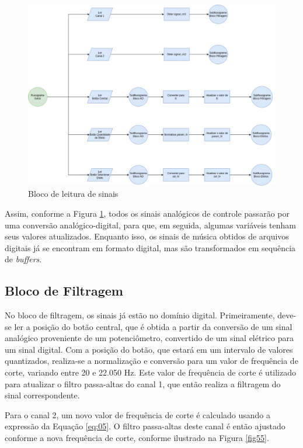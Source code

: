 \begin{figure}[h]
    \centering
    \includegraphics[width=\textwidth]{figuras/fig54.png}
    \caption{Bloco de leitura de sinais}
    \label{fig54}
\end{figure}

Assim, conforme a Figura \ref{fig54}, todos os sinais analógicos de controle passarão por uma conversão analógico-digital, para que, em seguida, algumas variáveis tenham seus valores atualizados. Enquanto isso, os sinais de música obtidos de arquivos digitais já se encontram em formato digital, mas são transformados em sequência de \textit{buffers}.

\subsection{Bloco de Filtragem}

No bloco de filtragem, os sinais já estão no domínio digital. Primeiramente, deve-se ler a posição do botão central, que é obtida a partir da conversão de um sinal analógico proveniente de um potenciômetro, convertido de um sinal elétrico para um sinal digital. Com a posição do botão, que estará em um intervalo de valores quantizados, realiza-se a normalização e conversão para um valor de frequência de corte, variando entre 20 e 22.050 Hz. Este valor de frequência de corte é utilizado para atualizar o filtro passa-altas do canal 1, que então realiza a filtragem do sinal correspondente.

Para o canal 2, um novo valor de frequência de corte é calculado usando a expressão da Equação \ref{eq:05}. O filtro passa-altas deste canal é então ajustado conforme a nova frequência de corte, conforme ilustrado na Figura \ref{fig55}.

